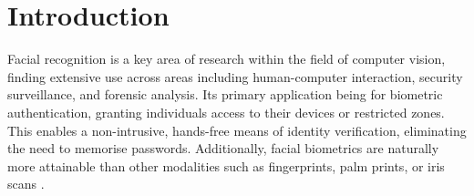 \documentclass{mpaper}
\begin{document}
\section{Introduction}
Facial recognition is a key area of research within the field of computer vision, finding extensive use across areas including human-computer interaction, security surveillance, and forensic analysis. Its primary application being for biometric authentication, granting individuals access to their devices or restricted zones. This enables a non-intrusive, hands-free means of identity verification, eliminating the need to memorise passwords. Additionally, facial biometrics are naturally more attainable than other modalities such as fingerprints, palm prints, or iris scans \cite{zhou20183d}.
\end{document}
